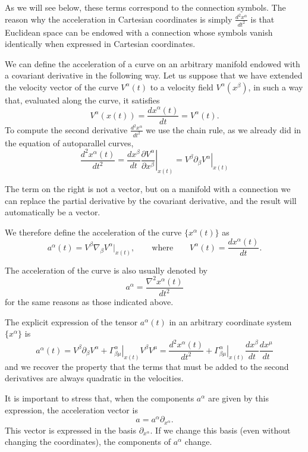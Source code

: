 \begin{points}
\item As we will see below, these terms correspond to the connection symbols. The reason why the acceleration in Cartesian coordinates is simply $\frac{d^2x^\alpha}{dt^2}$ is that Euclidean space can be endowed with a connection whose symbols vanish identically when expressed in Cartesian coordinates.

\item We can define the acceleration of a curve on an arbitrary manifold endowed with a covariant derivative in the following way. Let us suppose that we have extended the velocity vector of the curve $V^\alpha(t)$ to a velocity field $V^\alpha(x^\beta)$, in such a way that, evaluated along the curve, it satisfies
\[
  V^\alpha(x(t))=\frac{dx^\alpha(t)}{dt}=V^\alpha(t).
\]
To compute the second derivative $\frac{d^2x^\alpha}{dt^2}$ we use the chain rule, as we already did in the equation of autoparallel curves,
\[
  \frac{d^2x^\alpha(t)}{dt^2}=\frac{dx^\beta}{dt}\left.\frac{\partial V^\alpha}{\partial x^\beta}\right|_{x(t)}=\left.V^\beta\partial_\beta V^\alpha\right|_{x(t)}
\]

\item The term on the right is not a vector, but on a manifold with a connection we can replace the partial derivative by the covariant derivative, and the result will automatically be a vector.

\item We therefore define the acceleration of the curve $\{x^\alpha(t)\}$ as
\[
  a^\alpha(t)=V^\beta\nabla_\beta V^\alpha|_{x(t)},\qquad\text{where}\qquad V^\alpha(t)=\frac{dx^\alpha(t)}{dt}.
\]

\item The acceleration of the curve is also usually denoted by
\[
  a^\alpha=\frac{\nabla^2x^\alpha(t)}{dt^2}
\]
for the same reasons as those indicated above.

\item The explicit expression of the tensor $a^\alpha(t)$ in an arbitrary coordinate system $\{x^\alpha\}$ is
\[
  a^\alpha(t)=V^\beta\partial_\beta V^\alpha+\left.\Gamma^\alpha_{\beta\mu}\right|_{x(t)}V^\beta V^\mu=\frac{d^2x^\alpha(t)}{dt^2}+\left.\Gamma^\alpha_{\beta\mu}\right|_{x(t)}\frac{dx^\beta}{dt}\frac{dx^\mu}{dt}
\]
and we recover the property that the terms that must be added to the second derivatives are always quadratic in the velocities.

\item It is important to stress that, when the components $a^\alpha$ are given by this expression, the acceleration vector is
\[
  a=a^\alpha\partial_{x^\alpha} .
\]
This vector is expressed in the basis $\partial_{x^\alpha}$. If we change this basis (even without changing the coordinates), the components of $a^\alpha$ change.


\end{points}
